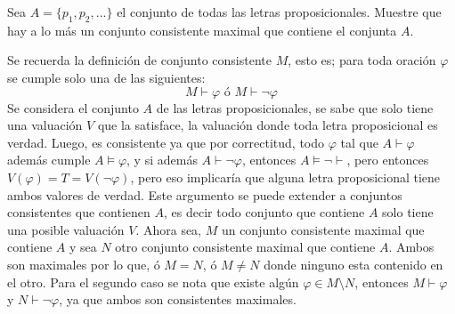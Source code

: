 \begin{prob}[Bonus]
    Sea \(A=\{p_1,p_2,...\}\) el conjunto de todas las letras proposicionales. Muestre que hay a lo más un conjunto consistente maximal que contiene el conjunta \(A\).
\end{prob}

\begin{sol}
    Se recuerda la definición de conjunto consistente \(M\), esto es; para toda oración \(\varphi\) se cumple solo una de las siguientes:
    \[
        M\vdash \varphi\text{ ó }M\vdash\neg\varphi
    \]
    Se considera el conjunto \(A\) de las letras proposicionales, se sabe que solo tiene una valuación \(V\) que la satisface, la valuación donde toda letra proposicional es verdad. Luego, es consistente ya que por correctitud, todo \(\varphi\) tal que \(A\vdash\varphi\) además cumple \(A\models\varphi\), y si además \(A\vdash\neg\varphi\), entonces \(A\models\neg\vdash\), pero entonces \(V(\varphi)=T=V(\neg\varphi)\), pero eso implicaría que alguna letra proposicional tiene ambos valores de verdad. Este argumento se puede extender a conjuntos consistentes que contienen \(A\), es decir todo conjunto que contiene \(A\) solo tiene una posible valuación \(V\). Ahora sea, \(M\) un conjunto consistente maximal que contiene \(A\) y sea \(N\) otro conjunto consistente maximal que contiene \(A\). Ambos son maximales por lo que, ó \(M=N\), ó \(M\neq N\) donde ninguno esta contenido en el otro. Para el segundo caso se nota que existe algún \(\varphi\in M\setminus N\), entonces \(M\vdash\varphi\) y \(N\vdash\neg\varphi\), ya que ambos son consistentes maximales.
\end{sol}





